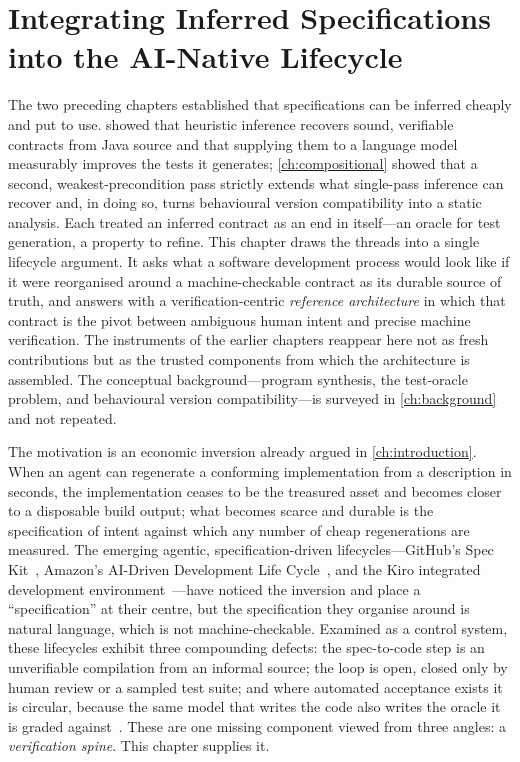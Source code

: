 \chapter{Integrating Inferred Specifications into the AI-Native Lifecycle}\label{ch:integration}

The two preceding chapters established that specifications can be inferred cheaply
and put to use.  showed that heuristic inference recovers sound,
verifiable contracts from Java source and that supplying them to a language model
measurably improves the tests it generates; \cref{ch:compositional} showed that a
second, weakest-precondition pass strictly extends what single-pass inference can
recover and, in doing so, turns behavioural version compatibility into a static
analysis. Each treated an inferred contract as an end in itself---an oracle for
test generation, a property to refine. This chapter draws the threads into a
single lifecycle argument. It asks what a software development process would look
like if it were reorganised around a machine-checkable contract as its durable
source of truth, and answers with a verification-centric \emph{reference
architecture} in which that contract is the pivot between ambiguous human intent
and precise machine verification. The instruments of the earlier chapters reappear
here not as fresh contributions but as the trusted components from which the
architecture is assembled. The conceptual background---program synthesis, the
test-oracle problem, and behavioural version compatibility---is surveyed in
\cref{ch:background} and not repeated.

The motivation is an economic inversion already argued in \cref{ch:introduction}.
When an agent can regenerate a conforming implementation from a description in
seconds, the implementation ceases to be the treasured asset and becomes closer to
a disposable build output; what becomes scarce and durable is the specification of
intent against which any number of cheap regenerations are measured. The emerging
agentic, specification-driven lifecycles---GitHub's Spec Kit~\citep{githubspeckit},
Amazon's AI-Driven Development Life Cycle~\citep{awsaidlc}, and the Kiro
integrated development environment~\citep{awskiro}---have noticed the inversion and
place a ``specification'' at their centre, but the specification they organise
around is natural language, which is not machine-checkable. Examined as a control
system, these lifecycles exhibit three compounding defects: the spec-to-code step
is an unverifiable compilation from an informal source; the loop is open, closed
only by human review or a sampled test suite; and where automated acceptance
exists it is circular, because the same model that writes the code also writes the
oracle it is graded against~\citep{liu2023evalplus,liu2026oracle}. These are one
missing component viewed from three angles: a \emph{verification spine}. This
chapter supplies it.

